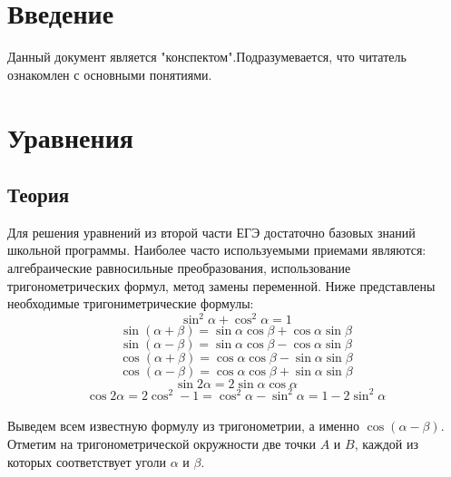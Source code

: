 \documentclass{article}
\begin{document}
\large
\tableofcontents %
\newpage
\section{Введение}
Данный документ является "конспектом".Подразумевается, что читатель ознакомлен с основными
понятиями.

\section{Уравнения}
\subsection{Теория}
Для решения уравнений из второй части ЕГЭ достаточно базовых знаний школьной программы. Наиболее часто используемыми приемами являются: алгебраические
равносильные преобразования, использование 
тригонометрических формул, метод замены переменной. Ниже представлены необходимые тригониметрические формулы:
\\
\[ \sin^2 \alpha + \cos^2 \alpha = 1 \]
\[ 
\sin (\alpha + \beta) = \sin \alpha \cos \beta + \cos \alpha \sin \beta
\]
\[
\sin (\alpha - \beta) = \sin \alpha \cos \beta - \cos \alpha \sin \beta
\]
\[
\cos (\alpha + \beta) =
\cos \alpha \cos \beta - \sin \alpha \sin \beta
\]
\[
\cos (\alpha - \beta) =
\cos \alpha \cos \beta + \sin \alpha \sin \beta
\]
\[
\sin 2\alpha = 2 \sin \alpha \cos \alpha
\]
\[
\cos 2\alpha = 2\cos^2 - 1 = \cos^2 \alpha - \sin^2 \alpha =
1 - 2 \sin^2 \alpha
\]
\\
Выведем всем известную формулу из тригонометрии, а именно \( \cos (\alpha - \beta)\). Отметим на 
тригонометрической окружности две точки $A$ и $B$, каждой из которых соответствует уголи $\alpha$
и $\beta$. 
\begin{figure}[h]
\end{figure}
\end{document}
